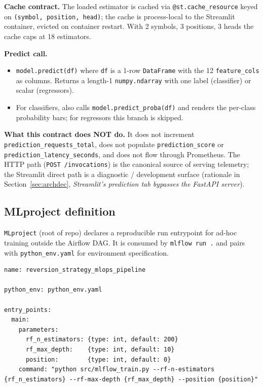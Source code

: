 \documentclass[11pt,a4paper]{article}
\begin{document}
\textbf{Cache contract.} The loaded estimator is cached via \texttt{@st.cache\_resource} keyed on \texttt{(symbol, position, head)}; the cache is process-local to the Streamlit container, evicted on container restart. With 2 symbols, 3 positions, 3 heads the cache caps at 18 estimators.

\textbf{Predict call.}
\begin{itemize}[leftmargin=1.5em,itemsep=0pt]
  \item \texttt{model.predict(df)} where \texttt{df} is a 1-row \texttt{DataFrame} with the 12 \texttt{feature\_cols} as columns. Returns a length-1 \texttt{numpy.ndarray} with one label (classifier) or scalar (regressors).
  \item For classifiers, also calls \texttt{model.predict\_proba(df)} and renders the per-class probability bars; for regressors this branch is skipped.
\end{itemize}

\textbf{What this contract does NOT do.} It does not increment \texttt{prediction\_requests\_total}, does not populate \texttt{prediction\_score} or \texttt{prediction\_latency\_seconds}, and does not flow through Prometheus. The HTTP path (\texttt{POST /invocations}) is the canonical source of serving telemetry; the Streamlit direct path is a diagnostic / development surface (rationale in Section~\ref{sec:archdec}, \emph{Streamlit's prediction tab bypasses the FastAPI server}).

\subsection{MLproject definition}\label{sec:mlproject}

\texttt{MLproject} (root of repo) declares a reproducible run entrypoint for ad-hoc training outside the Airflow DAG. It is consumed by \texttt{mlflow run .} and pairs with \texttt{python\_env.yaml} for environment specification.

\begin{lstlisting}[style=yamlstyle]
name: reversion_strategy_mlops_pipeline

python_env: python_env.yaml

entry_points:
  main:
    parameters:
      rf_n_estimators: {type: int, default: 200}
      rf_max_depth:    {type: int, default: 10}
      position:        {type: int, default: 0}
    command: "python src/mlflow_train.py --rf-n-estimators {rf_n_estimators} --rf-max-depth {rf_max_depth} --position {position}"
\end{lstlisting}
\end{document}
